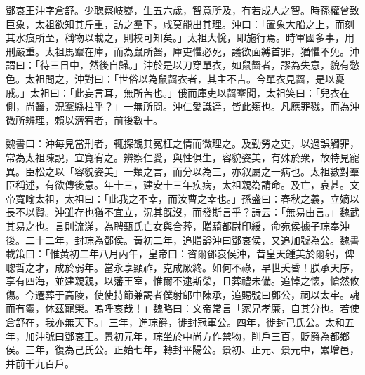 
\begin{pinyinscope}
鄧哀王沖字倉舒。少聦察岐嶷，生五六歲，智意所及，有若成人之智。時孫權曾致巨象，太祖欲知其斤重，訪之羣下，咸莫能出其理。沖曰：「置象大船之上，而刻其水痕所至，稱物以載之，則校可知矣。」太祖大恱，即施行焉。時軍國多事，用刑嚴重。太祖馬鞌在庫，而為鼠所齧，庫吏懼必死，議欲面縛首罪，猶懼不免。沖謂曰：「待三日中，然後自歸。」沖於是以刀穿單衣，如鼠齧者，謬為失意，貌有愁色。太祖問之，沖對曰：「世俗以為鼠齧衣者，其主不吉。今單衣見齧，是以憂戚。」太祖曰：「此妄言耳，無所苦也。」俄而庫吏以齧鞌聞，太祖笑曰：「兒衣在側，尚齧，況鞌縣柱乎？」一無所問。沖仁愛識達，皆此類也。凡應罪戮，而為沖微所辨理，賴以濟宥者，前後數十。

魏書曰：沖每見當刑者，輒探覩其冤枉之情而微理之。及勤勞之吏，以過誤觸罪，常為太祖陳說，宜寬宥之。辨察仁愛，與性俱生，容貌姿美，有殊於衆，故特見寵異。臣松之以「容貌姿美」一類之言，而分以為三，亦叙屬之一病也。太祖數對羣臣稱述，有欲傳後意。年十三，建安十三年疾病，太祖親為請命。及亡，哀甚。文帝寬喻太祖，太祖曰：「此我之不幸，而汝曹之幸也。」孫盛曰：春秋之義，立嫡以長不以賢。沖雖存也猶不宜立，況其旣沒，而發斯言乎？詩云：「無易由言。」魏武其易之也。言則流涕，為聘甄氏亡女與合葬，贈騎都尉印綬，命宛侯據子琮奉沖後。二十二年，封琮為鄧侯。黃初二年，追贈謚沖曰鄧哀侯，又追加號為公。魏書載策曰：「惟黃初二年八月丙午，皇帝曰：咨爾鄧哀侯沖，昔皇天鍾美於爾躬，俾聦哲之才，成於弱年。當永享顯祚，克成厥終。如何不祿，早世夭昏！朕承天序，享有四海，並建親親，以藩王室，惟爾不逮斯榮，且葬禮未備。追悼之懷，愴然攸傷。今遷葬于高陵，使使持節兼謁者僕射郎中陳承，追賜號曰鄧公，祠以太牢。魂而有靈，休茲寵榮。嗚呼哀哉！」魏略曰：文帝常言「家兄孝廉，自其分也。若使倉舒在，我亦無天下。」三年，進琮爵，徙封冠軍公。四年，徙封己氏公。太和五年，加沖號曰鄧哀王。景初元年，琮坐於中尚方作禁物，削戶三百，貶爵為都鄉侯。三年，復為己氏公。正始七年，轉封平陽公。景初、正元、景元中，累增邑，并前千九百戶。


\end{pinyinscope}